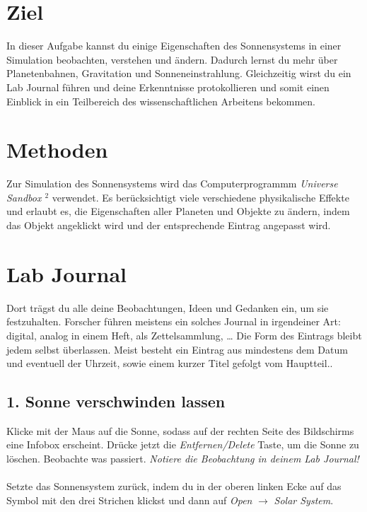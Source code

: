\documentclass[11pt,A4]{article}
\begin{document}
\section*{Ziel}

In dieser Aufgabe kannst du einige Eigenschaften des Sonnensystems in einer Simulation beobachten, verstehen und ändern.
Dadurch lernst du mehr über Planetenbahnen, Gravitation und Sonneneinstrahlung.
Gleichzeitig wirst du ein Lab Journal führen und deine Erkenntnisse protokollieren und somit einen Einblick in ein Teilbereich des wissenschaftlichen Arbeitens bekommen.

\section*{Methoden}

Zur Simulation des Sonnensystems wird das Computerprogrammm \textit{Universe Sandbox $^2$} verwendet.
Es berücksichtigt viele verschiedene physikalische Effekte und erlaubt es, die Eigenschaften aller Planeten und Objekte zu ändern, indem das Objekt angeklickt wird und der entsprechende Eintrag angepasst wird.

\section*{Lab Journal}

Dort trägst du alle deine Beobachtungen, Ideen und Gedanken ein, um sie festzuhalten.
Forscher führen meistens ein solches Journal in irgendeiner Art: digital, analog in einem Heft, als Zettelsammlung, \dots
Die Form des Eintrags bleibt jedem selbst überlassen.
Meist besteht ein Eintrag aus mindestens dem Datum und eventuell der Uhrzeit, sowie einem kurzer Titel gefolgt vom Hauptteil..


\subsection*{1. Sonne verschwinden lassen}
Klicke mit der Maus auf die Sonne, sodass auf der rechten Seite des Bildschirms eine Infobox erscheint.
Drücke jetzt die \textit{Entfernen/Delete} Taste, um die Sonne zu löschen.
Beobachte was passiert.
\textit{Notiere die Beobachtung in deinem Lab Journal!}\\\\
Setzte das Sonnensystem zurück, indem du in der oberen linken Ecke auf das Symbol mit den drei Strichen klickst und dann auf \textit{Open} $\to$ \textit{Solar System}.
\end{document}
